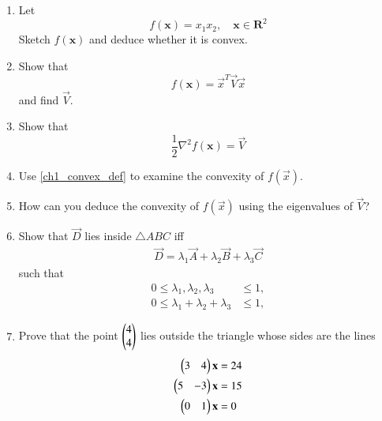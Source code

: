 \begin{enumerate}[label=\arabic*.,ref=\thesubsection.\theenumi]
\item
Let 
\begin{equation}
f(\mathbf{x}) = x_1x_2, \quad \mathbf{x} \in \mathbf{R}^2
\end{equation}
Sketch $f(\mathbf{x})$ and deduce whether it is convex.
\item Show that 
\begin{equation}
f(\mathbf{x}) = \vec{x}^T\vec{V}\vec{x} 
\end{equation}
%
and find $\vec{V}$.
\item Show that 
\begin{equation}
\frac{1}{2}\nabla^2f(\mathbf{x}) = \vec{V}
\end{equation}

\item Use \eqref{ch1_convex_def} to examine the convexity of $f(\vec{x})$.
\item How can you deduce the convexity of $f(\vec{x})$ using the eigenvalues of $\vec{V}$?
\item Show that $\vec{D}$ lies inside $\triangle ABC$ iff
\begin{align}
\vec{D} = \lambda_1\vec{A} + \lambda_2\vec{B} + \lambda_3\vec{C}
\end{align}
such that
\begin{align}
0 \le \lambda_1, \lambda_2, \lambda_3 &\le 1,
\\
0 \le \lambda_1+\lambda_2+\lambda_3 &\le 1,
\end{align}
\item Prove that the point $\begin{pmatrix}4\\4\end{pmatrix}$ lies outside the triangle whose sides are the lines
\begin{align}
\begin{pmatrix}3&4\end{pmatrix} \mathbf{x}&= 24
\\
\begin{pmatrix} 5 & - 3\end{pmatrix} \mathbf{x}&= 15
\\
\begin{pmatrix}0 &1\end{pmatrix} \mathbf{x}&= 0
\end{align}


\end{enumerate}
%
